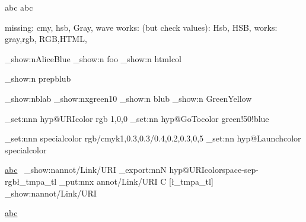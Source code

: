 \documentclass{article}
\begin{document}
\color{foo} abc \color{foo!!+} abc

\makeatletter

\expandafter\show\csname\string{}\endcsname 

missing: cmy, hsb, Gray, wave
works: (but check values): Hsb, HSB,
works: gray,rgb, RGB,HTML,



\ExplSyntaxOn
\color_show:n{AliceBlue}
\color_show:n {foo}
\color_show:n {htmlcol}

\color_show:n {prepblub}

\color_show:n{blab}
\color_show:n{xgreen10}
\color_show:n {blub}
\color_show:n {GreenYellow}

\color_set:nnn { hyp@URIcolor } {rgb }{1,0,0}
\color_set:nn  { hyp@GoTocolor }   {green!50!blue }

\color_set:nnn { specialcolor }{rgb/cmyk}{1,0.3,0.3/0.4,0.2,0.3,0,5}
\color_set:nn  { hyp@Launchcolor }{specialcolor}

\url{abc}~
\pdfdict_show:n{annot/Link/URI}
\color_export:nnN {hyp@URIcolor}{space-sep-rgb}\l_tmpa_tl
\pdfdict_put:nnx
              {annot/Link/URI}
              { C }
              { [\l_tmpa_tl] }
\pdfdict_show:n{annot/Link/URI}

\url{abc}
\ExplSyntaxOff
\end{document}
